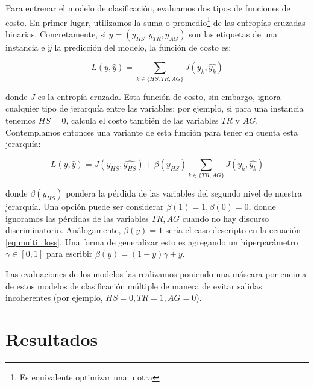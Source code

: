 Para entrenar el modelo de clasificación, evaluamos dos tipos de funciones de costo. En primer lugar, utilizamos la suma o promedio\footnote{Es equivalente optimizar una u otra} de las entropías cruzadas binarias. Concretamente, si $y = (y_{HS}, y_{TR}, y_{AG})$ son las etiquetas de una instancia e $\widehat{y}$ la predicción del modelo, la función de costo es:

\begin{equation}
\label{eq:multi_loss}
L(y, \widehat{y}) = \sum\limits_{k \in \{HS, TR, AG\}} J(y_k, \widehat{y_k})
\end{equation}

donde $J$ es la entropía cruzada. Esta función de costo, sin embargo, ignora cualquier tipo de jerarquía entre las variables; por ejemplo, si para una instancia tenemos $HS = 0$, calcula el costo también de las variables $TR$ y $AG$. Contemplamos entonces una variante de esta función para tener en cuenta esta jerarquía:

\begin{equation}
    \label{eq:hierarchical_loss}
    L(y, \widehat{y}) =  J(y_{HS}, \widehat{y_{HS}}) + \beta(y_{HS})\sum\limits_{k \in \{TR, AG\}} J(y_k, \widehat{y_k})
\end{equation}

donde $\beta(y_{HS})$ pondera la pérdida de las variables del segundo nivel de nuestra jerarquía. Una opción puede ser considerar $\beta(1) = 1, \beta(0) = 0$, donde ignoramos las pérdidas de las variables $TR, AG$ cuando no hay discurso discriminatorio. Análogamente, $\beta(y) = 1$ sería el caso descripto en la ecuación \ref{eq:multi_loss}. Una forma de generalizar esto es agregando un hiperparámetro $\gamma \in [0, 1]$ para escribir $\beta(y) = (1-y) \gamma + y$.

Las evaluaciones de los modelos las realizamos poniendo una máscara por encima de estos modelos de clasificación múltiple de manera de evitar salidas incoherentes (por ejemplo, $HS = 0, TR = 1, AG= 0$).


\section{Resultados}

\newcommand{\esrow}[1]{\multirow{#1}{*}{es}}
\newcommand{\enrow}[1]{\multirow{#1}{*}{en}}

